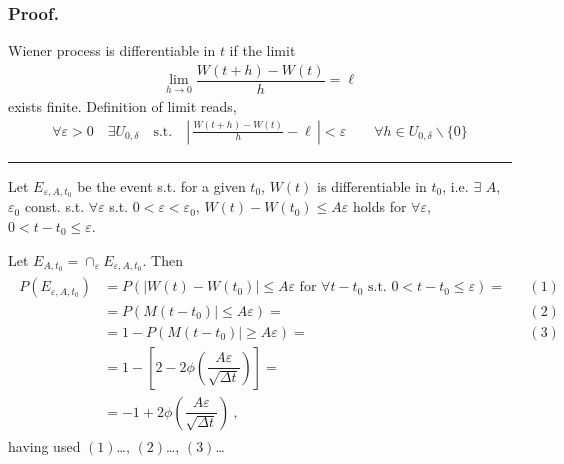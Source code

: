 \documentclass[letterpaper,10pt,english]{jupyterBook}
\begin{document}
\subsubsection*{Proof.}

\sphinxAtStartPar
{} 

\sphinxAtStartPar
Wiener process is differentiable in \(t\) if the limit
\begin{equation*}
\begin{split}\lim_{h \rightarrow 0} \dfrac{W(t+h) - W(t)}{h} = \ell\end{split}
\end{equation*}
\sphinxAtStartPar
exists finite. Definition of limit reads,
\begin{equation*}
\begin{split}\forall \varepsilon > 0 \quad \exists U_{0,\delta} \quad \text{s.t.} \quad \left| \, \frac{W(t+h) - W(t)}{h} - \ell \, \right| < \varepsilon \qquad \forall h \in U_{0,\delta} \backslash \{ 0 \}\end{split}
\end{equation*}
\sphinxAtStartPar
{} 


\bigskip\hrule\bigskip


\sphinxAtStartPar
Let \(E_{\varepsilon, A, t_0}\) be the event s.t. for a given \(t_0\), \(W(t)\) is differentiable in \(t_0\), i.e. \(\exists\) \(A\), \(\varepsilon_0\) const.  s.t. \(\forall \varepsilon\) s.t. \(0 < \varepsilon < \varepsilon_0\), \(W(t) - W(t_0) \le A \varepsilon\) holds for \(\forall \varepsilon\), \(0 < t - t_0 \le \varepsilon\).

\sphinxAtStartPar
Let \(E_{A, t_0} = \cap_{\varepsilon} E_{\varepsilon, A, t_0}\). Then
\begin{equation*}
\begin{split}\begin{aligned}
  P\left( E_{\varepsilon, A, t_0} \right) 
  & = P \left( |W(t) - W(t_0)| \le A \varepsilon \text{ for } \forall t-t_0 \text{ s.t. } 0 < t - t_0 \le \varepsilon \right) =  && (1) \\
  & = P \left( M(t - t_0)| \le A \varepsilon \right) = && (2) \\
  & = 1 - P \left( M(t - t_0)| \ge A \varepsilon \right) = && (3) \\
  & = 1 - \left[ 2 - 2 \phi \left( \dfrac{A \varepsilon}{\sqrt{\Delta t}} \right) \right] = \\
  & = - 1 + 2 \phi \left( \dfrac{A \varepsilon}{\sqrt{\Delta t}} \right)  \ ,
\end{aligned}\end{split}
\end{equation*}
\sphinxAtStartPar
having used \((1)\)…, \((2)\)…, \((3)\)…
\end{document}
